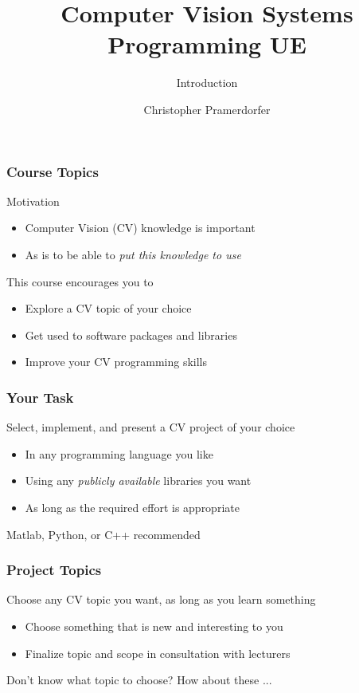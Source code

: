 \documentclass[xetex,professionalfont]{beamer}
\title{Computer Vision Systems Programming UE}
\subtitle{Introduction}
\author{Christopher Pramerdorfer}
\institute{Computer Vision Lab, Vienna University of Technology}
\begin{document}

\begin{frame}
\maketitle
\end{frame}


\begin{frame}
\frametitle{Course Topics}

Motivation
\begin{itemize}
	\item Computer Vision (CV) knowledge is important
	\item As is to be able to \emph{put this knowledge to use}
\end{itemize}

\bigskip
This course encourages you to
\begin{itemize}
	\item Explore a CV topic of your choice
	\item Get used to software packages and libraries
	\item Improve your CV programming skills
\end{itemize}

\end{frame}


\begin{frame}
\frametitle{Your Task}

Select, implement, and present a CV project of your choice
\begin{itemize}
	\item In any programming language you like
	\item Using any \emph{publicly available} libraries you want
	\item As long as the required effort is appropriate
\end{itemize}

\bigskip
Matlab, Python, or C++ recommended

\end{frame}


\begin{frame}
\frametitle{Project Topics}

Choose any CV topic you want, as long as you learn something
\begin{itemize}
	\item Choose something that is new and interesting to you
	\item Finalize topic and scope in consultation with lecturers
\end{itemize}

\bigskip
Don't know what topic to choose? How about these ...

\end{frame}
\end{document}

